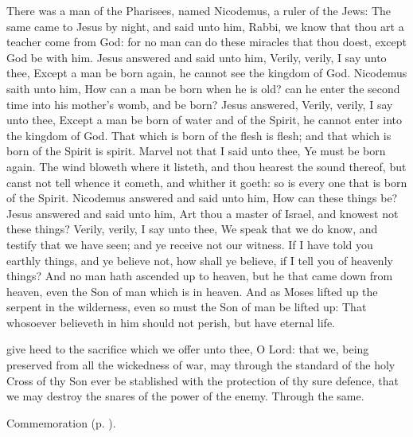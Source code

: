 \clearpage
{}
 There was a man of the Pharisees, named Nicodemus, a ruler of the Jews: The same came to Jesus by night, and said unto him, Rabbi, we know that thou art a teacher come from God: for no man can do these miracles that thou doest, except God be with him. Jesus answered and said unto him, Verily, verily, I say unto thee, Except a man be born again, he cannot see the kingdom of God. Nicodemus saith unto him, How can a man be born when he is old? can he enter the second time into his mother's womb, and be born? Jesus answered, Verily, verily, I say unto thee, Except a man be born of water and of the Spirit, he cannot enter into the kingdom of God. That which is born of the flesh is flesh; and that which is born of the Spirit is spirit. Marvel not that I said unto thee, Ye must be born again. The wind bloweth where it listeth, and thou hearest the sound thereof, but canst not tell whence it cometh, and whither it goeth: so is every one that is born of the Spirit. Nicodemus answered and said unto him, How can these things be? Jesus answered and said unto him, Art thou a master of Israel, and knowest not these things? Verily, verily, I say unto thee, We speak that we do know, and testify that we have seen; and ye receive not our witness. If I have told you earthly things, and ye believe not, how shall ye believe, if I tell you of heavenly things? And no man hath ascended up to heaven, but he that came down from heaven, even the Son of man which is in heaven. And as Moses lifted up the serpent in the wilderness, even so must the Son of man be lifted up: That whosoever believeth in him should not perish, but have eternal life.


\secret
{} give heed to the sacrifice which we offer unto thee, O Lord: that we, being preserved from all the wickedness of war, may through the standard of the holy Cross of thy Son ever be stablished with the protection of thy sure defence, that we may destroy the snares of the power of the enemy. Through the same.
\begin{rubric}
	 Commemoration  (p. \pageref{AlexanderEtcSecret}).
\end{rubric}

